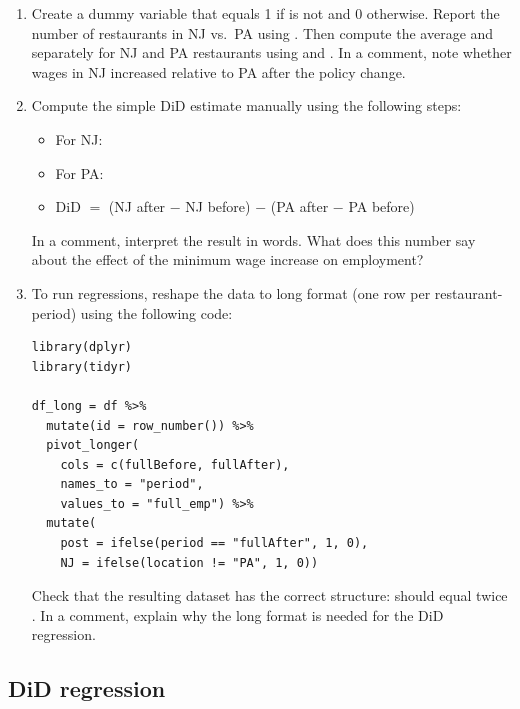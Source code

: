 \begin{enumerate}[label=\alph*)]
  \item Create a  dummy variable that equals 1 if  is not  and 0 otherwise. Report the number of restaurants in NJ vs.\ PA using . Then compute the average  and  separately for NJ and PA restaurants using  and . In a comment, note whether wages in NJ increased relative to PA after the policy change.
  \item Compute the simple DiD estimate manually using the following steps:
  \begin{itemize}
    \item For NJ: 
    \item For PA: 
    \item DiD $=$ (NJ after $-$ NJ before) $-$ (PA after $-$ PA before)
  \end{itemize}
  In a comment, interpret the result in words. What does this number say about the effect of the minimum wage increase on employment?
  \item To run regressions, reshape the data to long format (one row per restaurant-period) using the following code:
  \begin{lstlisting}
library(dplyr)
library(tidyr)

df_long = df %>%
  mutate(id = row_number()) %>%
  pivot_longer(
    cols = c(fullBefore, fullAfter),
    names_to = "period",
    values_to = "full_emp") %>%
  mutate(
    post = ifelse(period == "fullAfter", 1, 0),
    NJ = ifelse(location != "PA", 1, 0))
  \end{lstlisting}
  Check that the resulting dataset has the correct structure:  should equal twice . In a comment, explain why the long format is needed for the DiD regression.
\end{enumerate}

\subsection{DiD regression}

